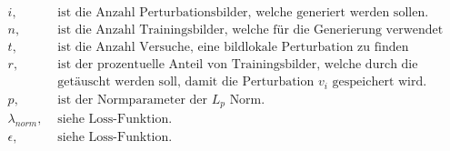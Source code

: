 \begin{align*}
i, &\text{ ist die Anzahl Perturbationsbilder, welche generiert werden sollen.} \\
n, &\text{ ist die Anzahl Trainingsbilder, welche für die Generierung verwendet werden.} \\
t, &\text{ ist die Anzahl Versuche, eine bildlokale Perturbation zu finden}\\
r, &\text{ ist der prozentuelle Anteil von Trainingsbilder, welche durch die Perturbationen} \\ 
&\text{  getäuscht werden soll, damit die Perturbation } v_i \text{ gespeichert wird.} \\
p, &\text{ ist der Normparameter der } L_p \text{ Norm.}\\
\lambda_{norm}, &\text{ siehe Loss-Funktion.}\\
\epsilon, &\text{ siehe Loss-Funktion.}
\end{align*}